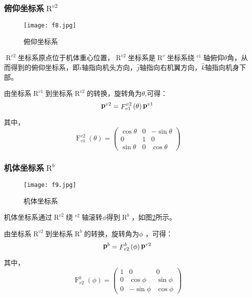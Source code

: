 \subsubsection{俯仰坐标系$\mathop R\nolimits^{v2} $}
\begin{figure}[!ht]
\centering
\texttt{[image: f8.jpg]}
\caption{俯仰坐标系}
\label{fig7}
\end{figure}
$\mathop R\nolimits^{v2} $坐标系原点位于机体重心位置，$\mathop R\nolimits^{v2} $坐标系是$\mathop R\nolimits^v $坐标系绕$\mathop {\hat j}\nolimits^{v1} $轴俯仰$\theta $角，从而得到的俯仰坐标系，即$\hat i$轴指向机头方向，$\hat j$轴指向右机翼方向，$\hat k$轴指向机身下部。

由坐标系$\mathop R\nolimits^{v1} $到坐标系$\mathop R\nolimits^{v2} $的转换，旋转角为$\theta $,可得：
\[\mathop {\bf{p}}\nolimits^{v2}  = \mathop F\nolimits_{v1}^{v2} \left( \theta  \right)\mathop {\bf{p}}\nolimits^{v1} \]

其中，\[\mathop F\nolimits_{v1}^{v2} \left( \theta  \right) = \left( {\begin{array}{*{20}{c}}
{\cos \theta }&0&{ - \sin \theta }\\
0&1&0\\
{\sin \theta }&0&{\cos \theta }
\end{array}} \right)\]
\subsubsection{机体坐标系$\mathop R\nolimits^b $}
\begin{figure}[!ht]
\centering
\texttt{[image: f9.jpg]}
\caption{机体坐标系}
\label{fig8}
\end{figure}
机体坐标系通过$\mathop R\nolimits^{v2} $绕$\mathop {\hat i}\nolimits^{v2} $轴滚转$\phi $得到$\mathop R\nolimits^b $，如图\ref{fig8}所示。

由坐标系$\mathop R\nolimits^{v2} $到坐标系$\mathop R\nolimits^b $的转换，旋转角为$\phi $ ，可得：
\[\mathop {\bf{p}}\nolimits^b  = \mathop F\nolimits_{v2}^b \left( \phi  \right)\mathop {\bf{p}}\nolimits^{v2} \]

其中，\[\mathop F\nolimits_{v2}^b \left( \phi  \right) = \left( {\begin{array}{*{20}{c}}
1&0&0\\
0&{\cos \phi }&{\sin \phi }\\
0&{ - \sin \phi }&{\cos \phi }
\end{array}} \right)\]

